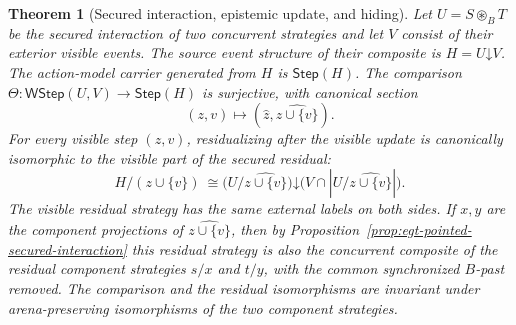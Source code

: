 \documentclass[11pt,a4paper]{article}
\numberwithin{equation}{section}
\newtheorem{theorem}{Theorem}[section]
\theoremstyle{definition}
\theoremstyle{remark}
\theoremstyle{plain}
\begin{document}
\begin{theorem}[Secured interaction, epistemic update, and hiding]
\label{thm:egt-secured-del-comparison}
Let $U=S\mathbin{\circledast_B}T$ be the secured interaction of two
concurrent strategies and let $V$ consist of their exterior visible
events. The source event structure of their composite is
$H=U\mathord{\downarrow}V$. The action-model carrier generated from
$H$ is $\mathsf{Step}(H)$. The comparison
$\Theta:\mathsf{WStep}(U,V)\to\mathsf{Step}(H)$ is surjective, with
canonical section
\begin{equation}\label{eq:egt-secured-weak-section}
 (z,v)\longmapsto
 (\widehat z,\widehat{z\cup\{v\}}).
\end{equation}
For every visible step $(z,v)$, residualizing after the visible update
is canonically isomorphic to the visible part of the secured residual:
\begin{equation}\label{eq:egt-secured-del-residual}
 H/(z\cup\{v\})
 \ \cong
 \bigl(U/\widehat{z\cup\{v\}}\bigr)
 \mathord{\downarrow}\bigl(V\cap|U/\widehat{z\cup\{v\}}|\bigr).
\end{equation}
The visible residual strategy has the same external labels on both
sides. If $x,y$ are the component projections of
$\widehat{z\cup\{v\}}$, then by
Proposition~\ref{prop:egt-pointed-secured-interaction} this residual
strategy is also the concurrent composite of the residual component
strategies $s/x$ and $t/y$, with the common synchronized $B$-past
removed. The comparison and the residual isomorphisms are invariant
under arena-preserving isomorphisms of the two component strategies.
\end{theorem}
\end{document}
